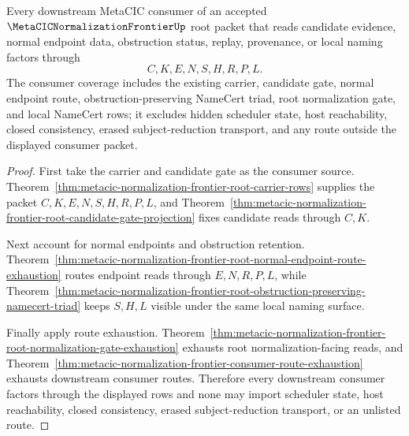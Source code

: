 \begin{theorem}
\label{thm:metacic-normalization-frontier-root-downstream-consumer-coverage}
Every downstream MetaCIC consumer of an accepted $\MetaCICNormalizationFrontierUp$ root packet that reads candidate evidence, normal endpoint data, obstruction status, replay, provenance, or local naming factors through
$$
C,K,E,N,S,H,R,P,L.
$$
The consumer coverage includes the existing carrier, candidate gate, normal endpoint route, obstruction-preserving NameCert triad, root normalization gate, and local NameCert rows; it excludes hidden scheduler state, host reachability, closed consistency, erased subject-reduction transport, and any route outside the displayed consumer packet.
\end{theorem}
\begin{proof}
First take the carrier and candidate gate as the consumer source. Theorem~\ref{thm:metacic-normalization-frontier-root-carrier-rows} supplies the packet $C,K,E,N,S,H,R,P,L$, and Theorem~\ref{thm:metacic-normalization-frontier-root-candidate-gate-projection} fixes candidate reads through $C,K$.

Next account for normal endpoints and obstruction retention. Theorem~\ref{thm:metacic-normalization-frontier-root-normal-endpoint-route-exhaustion} routes endpoint reads through $E,N,R,P,L$, while Theorem~\ref{thm:metacic-normalization-frontier-root-obstruction-preserving-namecert-triad} keeps $S,H,L$ visible under the same local naming surface.

Finally apply route exhaustion. Theorem~\ref{thm:metacic-normalization-frontier-root-normalization-gate-exhaustion} exhausts root normalization-facing reads, and Theorem~\ref{thm:metacic-normalization-frontier-consumer-route-exhaustion} exhausts downstream consumer routes. Therefore every downstream consumer factors through the displayed rows and none may import scheduler state, host reachability, closed consistency, erased subject-reduction transport, or an unlisted route.
\end{proof}

